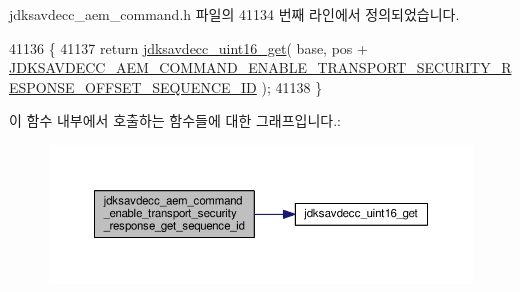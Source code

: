 jdksavdecc\+\_\+aem\+\_\+command.\+h 파일의 41134 번째 라인에서 정의되었습니다.


\begin{DoxyCode}
41136 \{
41137     \textcolor{keywordflow}{return} \hyperlink{group__endian_ga3fbbbc20be954aa61e039872965b0dc9}{jdksavdecc\_uint16\_get}( base, pos + 
      \hyperlink{group__command__enable__transport__security__response_ga8cfc3046a488fb8ef87dd6be5cbae236}{JDKSAVDECC\_AEM\_COMMAND\_ENABLE\_TRANSPORT\_SECURITY\_RESPONSE\_OFFSET\_SEQUENCE\_ID}
       );
41138 \}
\end{DoxyCode}


이 함수 내부에서 호출하는 함수들에 대한 그래프입니다.\+:
\nopagebreak
\begin{figure}[H]
\begin{center}
\leavevmode
\includegraphics[width=350pt]{group__command__enable__transport__security__response_ga4f8356eb70662df52313d139410cd489_cgraph}
\end{center}
\end{figure}


